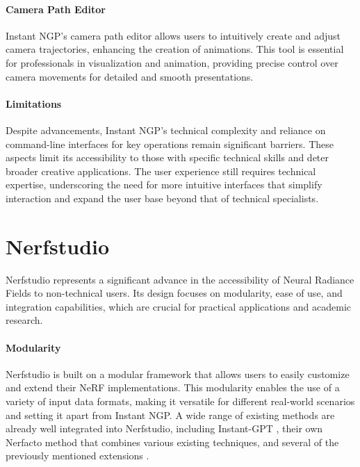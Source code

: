 \paragraph{Camera Path Editor}
Instant NGP's camera path editor allows users to intuitively create and adjust camera trajectories, enhancing the creation of animations.
This tool is essential for professionals in visualization and animation, providing precise control over camera movements for detailed and smooth presentations.

\paragraph{Limitations}
Despite advancements, Instant NGP's technical complexity and reliance on command-line interfaces for key operations remain significant barriers.
These aspects limit its accessibility to those with specific technical skills and deter broader creative applications.
The user experience still requires technical expertise, underscoring the need for more intuitive interfaces that simplify interaction and expand the user base beyond that of technical specialists.

\section{Nerfstudio}
\label{sec:related:nerfstudio}

Nerfstudio \cite{tancik_nerfstudio_2023} represents a significant advance in the accessibility of Neural Radiance Fields to non-technical users.
Its design focuses on modularity, ease of use, and integration capabilities, which are crucial for practical applications and academic research.

\paragraph{Modularity}
Nerfstudio is built on a modular framework that allows users to easily customize and extend their NeRF implementations.
This modularity enables the use of a variety of input data formats, making it versatile for different real-world scenarios and setting it apart from Instant NGP.
A wide range of existing methods are already well integrated into Nerfstudio, including Instant-GPT \cite{muller_instant_2022}, their own Nerfacto \cite{noauthor_nerfacto_nodate} method that combines various existing techniques, and several of the previously mentioned extensions \cite{haque_instruct-nerf2nerf_2023,jan-niklas_dihlmann_signerf_2024}.

